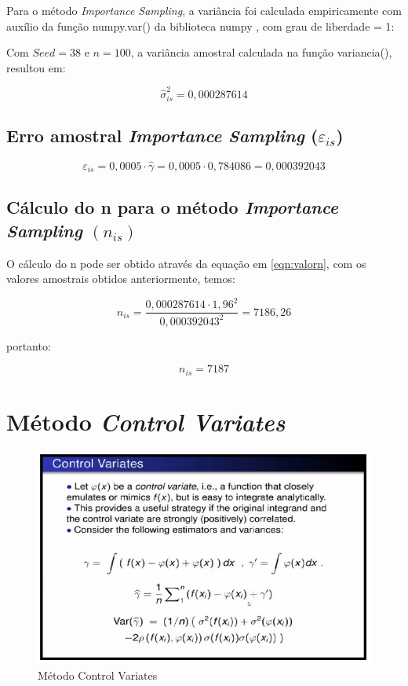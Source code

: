 \documentclass{article}
\begin{document}
Para o método \textit{Importance Sampling}, a variância foi calculada empiricamente com auxílio da função numpy.var() da biblioteca numpy \cite{harris2020array}, com grau de liberdade = 1:

Com $Seed=38$ e $n=100$, a variância amostral calculada na função variancia(), resultou em:

\[
    \hat{\sigma}_{is}^2 = 0,000287614
\]

\subsection{Erro amostral \textit{Importance Sampling} ($\varepsilon_{is}$)}

\begin{equation*}
    \varepsilon_{is} = 0,0005\cdot\hat{\gamma} = 0,0005\cdot0,784086 = 0,000392043
\end{equation*}

\subsection{Cálculo do n para o método \textit{Importance Sampling} $(n_{is})$}

O cálculo do n pode ser obtido através da equação em \ref{eqn:valorn}, com os valores amostrais obtidos anteriormente, temos:

\begin{equation*}
    n_{is} = \frac{0,000287614\cdot1,96^2}{0,000392043^2} = 7186,26
\end{equation*}

portanto:

\[
    n_{is} = 7187
\]



\section{Método \textit{Control Variates}}

\begin{figure}[H]
    \centering
    \includegraphics[width=.7\linewidth]{Imagens/MC_ControlVariates.png}
    \caption{Método Control Variates}
    \label{fig:ControlVar}
\end{figure}
\end{document}
